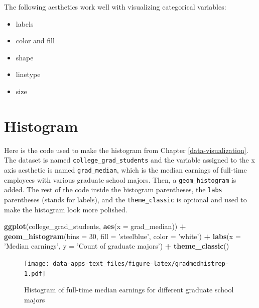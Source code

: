\documentclass[
]{book}
\newenvironment{Shaded}{\begin{snugshade}}{\end{snugshade}}
\newcommand{\DataTypeTok}[1]{\textcolor[rgb]{0.13,0.29,0.53}{#1}}
\newcommand{\DecValTok}[1]{\textcolor[rgb]{0.00,0.00,0.81}{#1}}
\newcommand{\KeywordTok}[1]{\textcolor[rgb]{0.13,0.29,0.53}{\textbf{#1}}}
\newcommand{\NormalTok}[1]{#1}
\newcommand{\OperatorTok}[1]{\textcolor[rgb]{0.81,0.36,0.00}{\textbf{#1}}}
\newcommand{\StringTok}[1]{\textcolor[rgb]{0.31,0.60,0.02}{#1}}
\providecommand{\tightlist}{%
  \setlength{\itemsep}{0pt}\setlength{\parskip}{0pt}}
\begin{document}
The following aesthetics work well with visualizing categorical variables:

\begin{itemize}
\tightlist
\item
  labels
\item
  color and fill
\item
  shape
\item
  linetype
\item
  size
\end{itemize}

\hypertarget{histogram}{%
\section{Histogram}\label{histogram}}

Here is the code used to make the histogram from Chapter \ref{data-visualization}. The dataset is named \texttt{college\_grad\_students} and the variable assigned to the x axis aesthetic is named \texttt{grad\_median}, which is the median earnings of full-time employees with various graduate school majors. Then, a \texttt{geom\_histogram} is added. The rest of the code inside the histogram parentheses, the \texttt{labs} parentheses (stands for labels), and the \texttt{theme\_classic} is optional and used to make the histogram look more polished.

\begin{Shaded}
\begin{Highlighting}[]
\KeywordTok{ggplot}\NormalTok{(college_grad_students, }\KeywordTok{aes}\NormalTok{(}\DataTypeTok{x =}\NormalTok{ grad_median)) }\OperatorTok{+}
\StringTok{  }\KeywordTok{geom_histogram}\NormalTok{(}\DataTypeTok{bins =} \DecValTok{30}\NormalTok{, }\DataTypeTok{fill =} \StringTok{'steelblue'}\NormalTok{, }\DataTypeTok{color =} \StringTok{'white'}\NormalTok{) }\OperatorTok{+}
\StringTok{  }\KeywordTok{labs}\NormalTok{(}\DataTypeTok{x =} \StringTok{'Median earnings'}\NormalTok{, }\DataTypeTok{y =} \StringTok{'Count of graduate majors'}\NormalTok{) }\OperatorTok{+}
\StringTok{  }\KeywordTok{theme_classic}\NormalTok{()}
\end{Highlighting}
\end{Shaded}

\begin{figure}
\centering
\texttt{[image: data-apps-text\_files/figure-latex/gradmedhistrep-1.pdf]}
\caption{\label{fig:gradmedhistrep}Histogram of full-time median earnings for different graduate school majors}
\end{figure}
\end{document}
